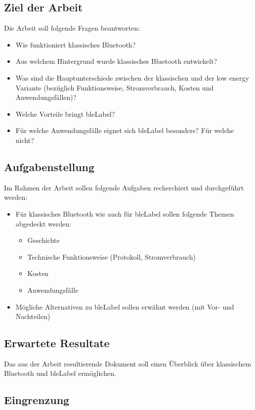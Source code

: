 \subsection{Ziel der Arbeit}
Die Arbeit soll folgende Fragen beantworten:
\begin{itemize}
	\item Wie funktioniert klassisches Bluetooth?
	\item Aus welchem Hintergrund wurde klassisches Bluetooth entwickelt?
	\item Was sind die Hauptunterschiede zwischen der klassischen und der low energy Variante (bezüglich Funktionsweise, Stromverbrauch, Kosten und Anwendungsfällen)?
	\item Welche Vorteile bringt \gls{bleLabel}?
	\item Für welche Anwendungsfälle eignet sich \gls{bleLabel} besonders? Für welche nicht?
\end{itemize}

\subsection{Aufgabenstellung}
Im Rahmen der Arbeit sollen folgende Aufgaben recherchiert und durchgeführt werden:
\begin{itemize}
	\item Für klassisches Bluetooth wie auch für \gls{bleLabel} sollen folgende Themen abgedeckt werden:
	\begin{itemize}
		\item Geschichte
		\item Technische Funktionsweise (Protokoll, Stromverbrauch)
		\item Kosten
		\item Anwendungsfälle
	\end{itemize}
	\item Mögliche Alternativen zu \gls{bleLabel} sollen erwähnt werden (mit Vor- und Nachteilen)
\end{itemize}

\subsection{Erwartete Resultate}
Das aus der Arbeit resultierende Dokument soll einen Überblick über klassischem Bluetooth und \gls{bleLabel} ermöglichen.

\subsection{Eingrenzung}

